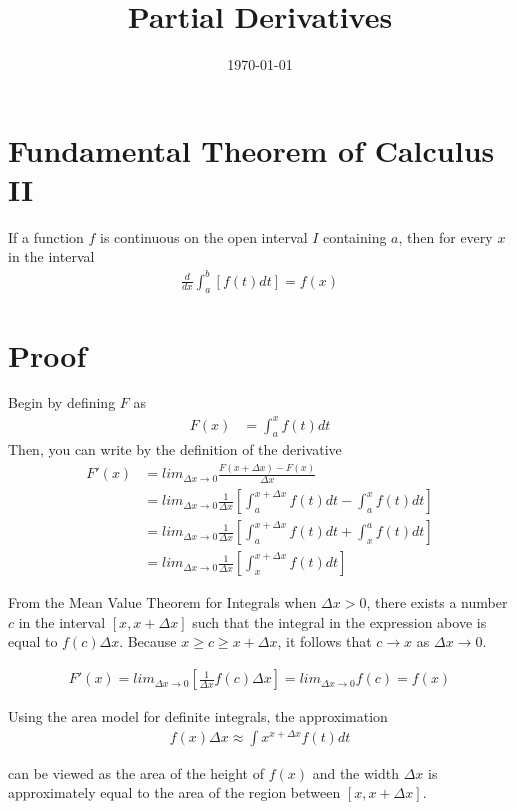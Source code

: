 \documentclass[a4paper, 12pt]{article}
\begin{document}
\title{Partial Derivatives}
\date{\today}
\pagestyle{empty} 
\section{Fundamental Theorem of Calculus II}
	If a function $f$ is continuous on the open interval $I$ containing $a$, then for every $x$ in the interval
\begin{align}
	\frac{d}{dx} \int_a^b [f(t) dt] = f(x)
\end{align}
\section{Proof}
	Begin by defining $F$ as
\begin{align}
	F(x) &= \int_a^x f(t) dt
\end{align}
	Then, you can write by the definition of the derivative
\begin{align*}
	F'(x) &= lim_{\Delta x \to 0} \frac{F(x + \Delta x) - F(x)}{\Delta x} \\
		  &= lim_{\Delta x \to 0} \frac{1}{\Delta x} [\int_{a}^{x + \Delta x} f(t) dt - \int_a^x f(t) dt ] \\
		  &=  lim_{\Delta x \to 0} \frac{1}{\Delta x} [\int_{a}^{x + \Delta x} f(t) dt + \int_x^a f(t) dt ] \\
		  &=  lim_{\Delta x \to 0} \frac{1}{\Delta x} [\int_{x}^{x + \Delta x} f(t) dt]
\end{align*}

	From the Mean Value Theorem for Integrals when $\Delta x > 0$, there exists a number $c$ in the interval $[x, x + \Delta x]$ such that the integral in the expression above is equal to $f(c) \Delta x$.  Because $x \geq c \geq x + \Delta x$, it follows that $c \to x$ as $\Delta x \to 0$.
	
\begin{align*}
	F'(x) = lim_{\Delta x \to 0} [\frac{1}{\Delta x} f(c) \Delta x ] = lim_{\Delta x \to 0} f(c) = f(x)
\end{align*}

	Using the area model for definite integrals, the approximation
\begin{align}
	f(x) \Delta x \approx \int{x}^{x + \Delta x} f(t) dt
\end{align}	

	can be viewed as the area of the height of $f(x)$ and the width $\Delta x$ is approximately equal to the area of the region between $[x, x + \Delta x]$.
\end{document}
